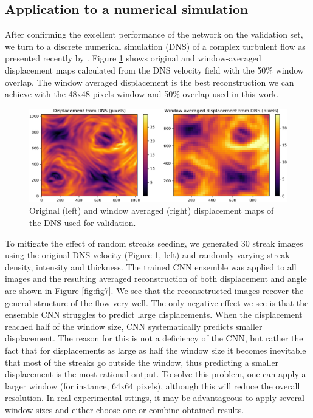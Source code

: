 \documentclass{svjour3}                     %
\begin{document}
\subsection{Application to a numerical simulation}

After confirming the excellent performance of the network on the validation set, we turn to a discrete numerical simulation (DNS) of a complex turbulent flow as presented recently by \cite{plumley2016effects}. Figure \ref{fig:fig6} shows original and window-averaged displacement maps calculated from the DNS velocity field with the 50\% window overlap. The window averaged displacement is the best reconstruction we can achieve with the 48x48 pixels window and 50\% overlap used in this work.

\begin{figure}
\includegraphics[width=\textwidth]{figs/figure5.png}
\caption{Original (left) and window averaged (right) displacement maps of the DNS \cite{plumley2016effects} used for validation.}
\label{fig:fig6}
\end{figure}

To mitigate the effect of random streaks seeding, we generated 30 streak images using the original DNS velocity (Figure \ref{fig:fig6}, left) and randomly varying streak density, intensity and thickness. The trained CNN ensemble was applied to all images and the resulting averaged reconstruction of both displacement and angle are shown in Figure \ref{fig:fig7}. We see that the reconsctructed images recover the general structure of the flow very well. The only negative effect we see is that the ensemble CNN struggles to predict large displacements. When the displacement reached half of the window size, CNN systematically predicts smaller displacement. The reason for this is not a deficiency of the CNN, but rather the fact that for displacements as large as half the window size it becomes inevitable that most of the streaks go outside the window, thus predicting a smaller displacement is the most rational output. To solve this problem, one can apply a larger window (for instance, 64x64 pixels), although this will reduce the overall resolution. In real experimental sttings, it may be advantageous to apply several window sizes and either choose one or combine obtained results.
\end{document}
